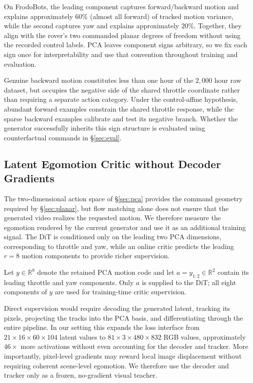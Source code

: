 \documentclass[letterpaper]{article} %
\begin{document}
On FrodoBots, the leading component captures forward/backward motion and
explains approximately $60\%$ (almost all forward) of tracked motion variance, while the second captures yaw and explains approximately $20\%$. Together, they align with the rover's two commanded planar degrees of freedom without using the recorded control labels. PCA leaves component signs arbitrary, so we fix each sign
once for interpretability and use that convention throughout training and
evaluation.

Genuine backward motion constitutes less than one hour of the
$2{,}000$ hour raw dataset, but occupies the negative side of the shared
throttle coordinate rather than requiring a separate action category.
Under the control-affine hypothesis, abundant forward examples constrain the
shared throttle response, while the sparse backward examples calibrate and
test its negative branch. Whether the generator successfully
inherits this sign structure is evaluated using counterfactual commands in
\S\ref{sec:eval}.

\subsection{Latent Egomotion Critic without Decoder Gradients}
\label{sec:critic}

The two-dimensional action space of \S\ref{sec:pca} provides the command
geometry required by \S\ref{sec:planar}, but flow matching alone does not
ensure that the generated video realizes the requested motion. We therefore
measure the egomotion rendered by the current generator and use it as an
additional training signal. The DiT is conditioned only on the leading two
PCA dimensions, corresponding to throttle and yaw, while an online critic
predicts the leading $r=8$ motion components to provide richer supervision.

Let $y\in\mathbb{R}^{8}$ denote the retained PCA motion code and let
$a=y_{1:2}\in\mathbb{R}^{2}$ contain its leading throttle and yaw
components. Only $a$ is supplied to the DiT; all eight components of $y$ are
used for training-time critic supervision.

Direct supervision would require decoding the generated latent, tracking its
pixels, projecting the tracks into the PCA basis, and differentiating through
the entire pipeline. In our setting this expands the loss interface from
$21\times16\times60\times104$ latent values to
$81\times3\times480\times832$ RGB values, approximately $46\times$ more
activations without even accounting for the decoder and tracker. More importantly, pixel-level gradients may reward local image displacement without requiring
coherent scene-level egomotion. We therefore use the decoder and tracker only
as a frozen, no-gradient visual teacher.
\end{document}
